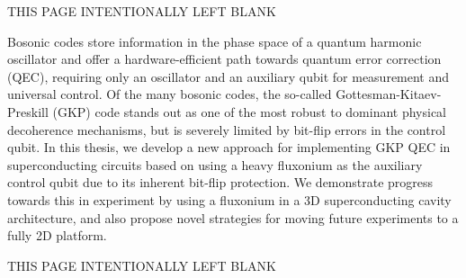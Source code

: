 
\cleardoublepage

\newpage 
\hbox{}\par\vfill\centerline%
{THIS PAGE INTENTIONALLY LEFT BLANK}%
\vfill
\newpage

\setcounter{savepage}{\thepage}
\begin{abstractpage}
Bosonic codes store information in the phase space of a quantum harmonic oscillator and offer a hardware-efficient path towards quantum error correction (QEC), requiring only an oscillator and an auxiliary qubit for measurement and universal control. Of the many bosonic codes, the so-called Gottesman-Kitaev-Preskill (GKP) code stands out as one of the most robust to dominant physical decoherence mechanisms, but is severely limited by bit-flip errors in the control qubit. In this thesis, we develop a new approach for implementing GKP QEC in superconducting circuits based on using a heavy fluxonium as the auxiliary control qubit due to its inherent bit-flip protection. We demonstrate progress towards this in experiment by using a fluxonium in a 3D superconducting cavity architecture, and also propose novel strategies for moving future experiments to a fully 2D platform. 
\end{abstractpage}

% 

\newpage 
\hbox{}\par\vfill\centerline%
{THIS PAGE INTENTIONALLY LEFT BLANK}%
\vfill
\newpage

\cleardoublepage